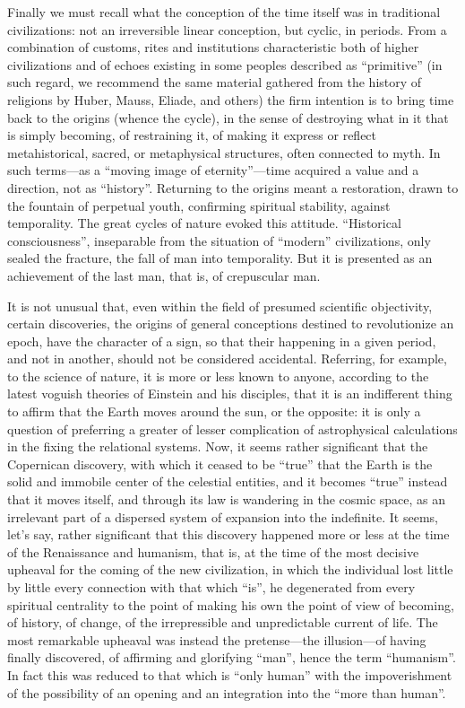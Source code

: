 Finally we must recall what the conception of the time itself was in traditional civilizations: not an irreversible linear conception, but cyclic, in periods. From a combination of customs, rites and institutions characteristic both of higher civilizations and of echoes existing in some peoples described as ``primitive'' (in such regard, we recommend the same material gathered from the history of religions by Huber, Mauss, Eliade, and others) the firm intention is to bring time back to the origins (whence the cycle), in the sense of destroying what in it that is simply becoming, of restraining it, of making it express or reflect metahistorical, sacred, or metaphysical structures, often connected to myth. In such terms---as a ``moving image of eternity''---time acquired a value and a direction, not as ``history''. Returning to the origins meant a restoration, drawn to the fountain of perpetual youth, confirming spiritual stability, against temporality. The great cycles of nature evoked this attitude. ``Historical consciousness'', inseparable from the situation of ``modern'' civilizations, only sealed the fracture, the fall of man into temporality. But it is presented as an achievement of the last man, that is, of crepuscular man.

It is not unusual that, even within the field of presumed scientific objectivity, certain discoveries, the origins of general conceptions destined to revolutionize an epoch, have the character of a sign, so that their happening in a given period, and not in another, should not be considered accidental. Referring, for example, to the science of nature, it is more or less known to anyone, according to the latest voguish theories of Einstein and his disciples, that it is an indifferent thing to affirm that the Earth moves around the sun, or the opposite: it is only a question of preferring a greater of lesser complication of astrophysical calculations in the fixing the relational systems. Now, it seems rather significant that the Copernican discovery, with which it ceased to be ``true'' that the Earth is the solid and immobile center of the celestial entities, and it becomes ``true'' instead that it moves itself, and through its law is wandering in the cosmic space, as an irrelevant part of a dispersed system of expansion into the indefinite. It seems, let's say, rather significant that this discovery happened more or less at the time of the Renaissance and humanism, that is, at the time of the most decisive upheaval for the coming of the new civilization, in which the individual lost little by little every connection with that which ``is'', he degenerated from every spiritual centrality to the point of making his own the point of view of becoming, of history, of change, of the irrepressible and unpredictable current of life. The most remarkable upheaval was instead the pretense---the illusion---of having finally discovered, of affirming and glorifying ``man'', hence the term ``humanism''. In fact this was reduced to that which is ``only human'' with the impoverishment of the possibility of an opening and an integration into the ``more than human''.

